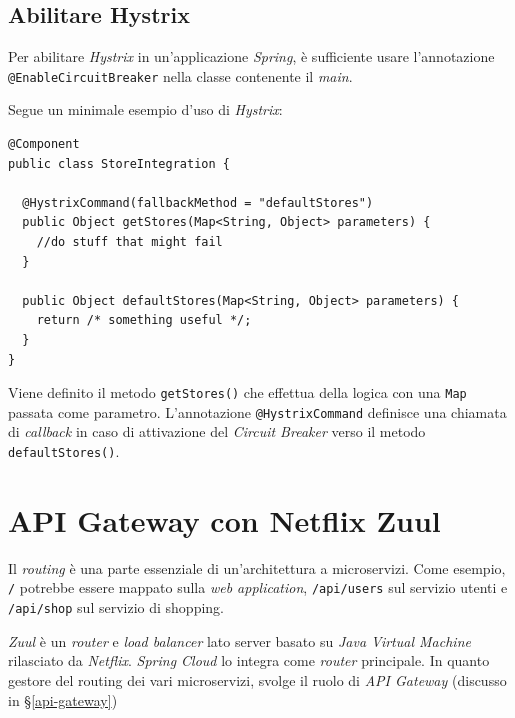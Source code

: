 \subsection{Abilitare Hystrix} Per abilitare \textit{Hystrix} in un'applicazione \textit{Spring},
è sufficiente usare l'annotazione \texttt{@EnableCircuitBreaker} nella classe contenente il \textit{main}.

Segue un minimale esempio d'uso di \textit{Hystrix}:


\begin{tcolorbox}
	\begin{lstlisting}
@Component
public class StoreIntegration {

  @HystrixCommand(fallbackMethod = "defaultStores")
  public Object getStores(Map<String, Object> parameters) {
    //do stuff that might fail
  }

  public Object defaultStores(Map<String, Object> parameters) {
    return /* something useful */;
  }
}
	\end{lstlisting}
\end{tcolorbox}

Viene definito il metodo \texttt{getStores()} che effettua della logica con una \texttt{Map} passata come parametro.
L'annotazione \texttt{@HystrixCommand} definisce una chiamata di \textit{callback} in caso di attivazione del \textit{Circuit Breaker} verso il metodo \texttt{defaultStores()}.



\section{API Gateway con Netflix Zuul}

Il \textit{routing} è una parte essenziale di un'architettura a microservizi. Come esempio, \texttt{/} potrebbe essere mappato sulla \textit{web application}, \texttt{/api/users} sul servizio utenti e \texttt{/api/shop} sul servizio di shopping.

\textit{Zuul} è un \textit{router} e \textit{load balancer} lato server basato su \textit{Java Virtual Machine} rilasciato da \textit{Netflix}. \textit{Spring Cloud} lo integra come \textit{router} principale. In quanto gestore del routing dei vari microservizi, svolge il ruolo di \textit{API Gateway} (discusso in \S\ref{api-gateway})

